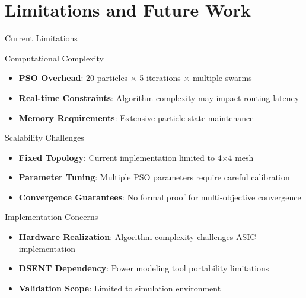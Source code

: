 \documentclass[10pt]{beamer}
\begin{document}
\section{Limitations and Future Work}

\begin{frame}{Current Limitations}
    \begin{alertblock}{Computational Complexity}
        \begin{itemize}
            \item \textbf{PSO Overhead}: 20 particles × 5 iterations × multiple swarms
            \item \textbf{Real-time Constraints}: Algorithm complexity may impact routing latency
            \item \textbf{Memory Requirements}: Extensive particle state maintenance
        \end{itemize}
    \end{alertblock}
    
    \begin{block}{Scalability Challenges}
        \begin{itemize}
            \item \textbf{Fixed Topology}: Current implementation limited to 4×4 mesh
            \item \textbf{Parameter Tuning}: Multiple PSO parameters require careful calibration
            \item \textbf{Convergence Guarantees}: No formal proof for multi-objective convergence
        \end{itemize}
    \end{block}
    
    \begin{exampleblock}{Implementation Concerns}
        \begin{itemize}
            \item \textbf{Hardware Realization}: Algorithm complexity challenges ASIC implementation
            \item \textbf{DSENT Dependency}: Power modeling tool portability limitations
            \item \textbf{Validation Scope}: Limited to simulation environment
        \end{itemize}
    \end{exampleblock}
\end{frame}
\end{document}
